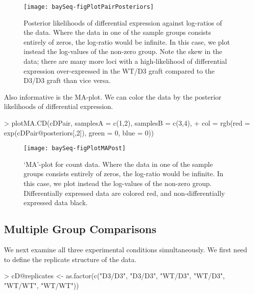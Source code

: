 \documentclass[a4paper]{article}
\begin{document}
\begin{figure}[!ht]
\begin{center}
\texttt{[image: baySeq-figPlotPairPosteriors]}
\caption{Posterior likelihoods of differential expression against log-ratios of the data. Where the data in one of the sample groups consists entirely of zeros, the log-ratio would be infinite. In this case, we plot instead the log-values of the non-zero group. Note the skew in the data; there are many more loci with a high-likelihood of differential expression over-expressed in the WT/D3 graft compared to the D3/D3 graft than vice versa.}
\label{figMAPost}
\end{center}
\end{figure}


 Also informative is the MA-plot. We can color the data by the posterior likelihoods of differential expression.
\begin{Schunk}
\begin{Sinput}
> plotMA.CD(cDPair, samplesA = c(1,2), samplesB = c(3,4),
+           col = rgb(red = exp(cDPair@posteriors[,2]), green = 0, blue = 0))
\end{Sinput}
\end{Schunk}

\begin{figure}[!ht]
\begin{center}
\texttt{[image: baySeq-figPlotMAPost]}
\caption{`MA'-plot for count data. Where the data in one of the sample groups consists entirely of zeros, the log-ratio would be infinite. In this case, we plot instead the log-values of the non-zero group. Differentially expressed data are colored red, and non-differentially expressed data black.}
\label{figMAPost}
\end{center}
\end{figure}


\subsection{Multiple Group Comparisons}

\label{sec:multgroup}

We next examine all three experimental conditions simultaneously. We first need to define the replicate structure of the data.
\begin{Schunk}
\begin{Sinput}
> cD@replicates <- as.factor(c("D3/D3", "D3/D3", "WT/D3", "WT/D3", "WT/WT", "WT/WT"))
\end{Sinput}
\end{Schunk}
\end{document}
